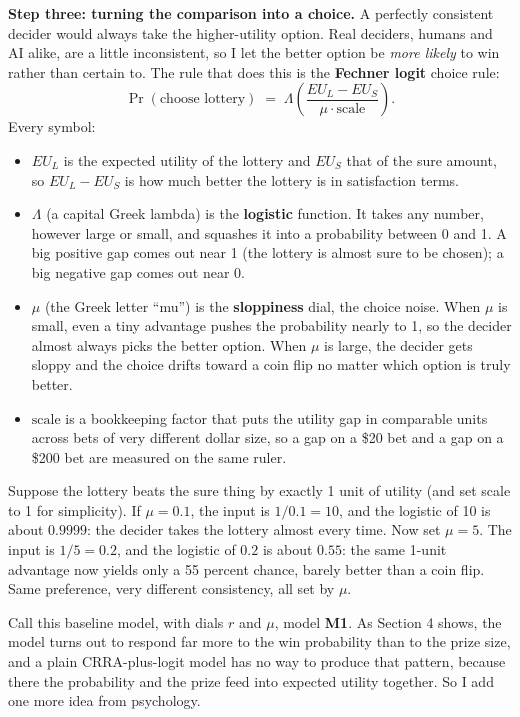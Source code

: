 \documentclass[11pt]{article}
\newcommand{\term}[1]{\textbf{\color{mossdk}#1}}
\begin{document}
\textbf{Step three: turning the comparison into a choice.} A perfectly consistent decider would always
take the higher-utility option. Real deciders, humans and AI alike, are a little inconsistent, so I let
the better option be \emph{more likely} to win rather than certain to. The rule that does this is the
\term{Fechner logit} choice rule:
\[
\Pr(\text{choose lottery}) \;=\; \Lambda\!\left(\frac{EU_L - EU_S}{\mu \cdot \text{scale}}\right).
\]
Every symbol:
\begin{itemize}
\item $EU_L$ is the expected utility of the lottery and $EU_S$ that of the sure amount, so $EU_L - EU_S$
is how much better the lottery is in satisfaction terms.
\item $\Lambda$ (a capital Greek lambda) is the \term{logistic} function. It takes any number, however
large or small, and squashes it into a probability between 0 and 1. A big positive gap comes out near 1
(the lottery is almost sure to be chosen); a big negative gap comes out near 0.
\item $\mu$ (the Greek letter ``mu'') is the \term{sloppiness} dial, the choice noise. When $\mu$ is
small, even a tiny advantage pushes the probability nearly to 1, so the decider almost always picks the
better option. When $\mu$ is large, the decider gets sloppy and the choice drifts toward a coin flip no
matter which option is truly better.
\item $\text{scale}$ is a bookkeeping factor that puts the utility gap in comparable units across bets of
very different dollar size, so a gap on a \$20 bet and a gap on a \$200 bet are measured on the same
ruler.
\end{itemize}

\begin{workbox}
Suppose the lottery beats the sure thing by exactly 1 unit of utility (and set scale to 1 for
simplicity). If $\mu = 0.1$, the input is $1/0.1 = 10$, and the logistic of 10 is about $0.9999$: the
decider takes the lottery almost every time. Now set $\mu = 5$. The input is $1/5 = 0.2$, and the
logistic of $0.2$ is about $0.55$: the same 1-unit advantage now yields only a 55 percent chance, barely
better than a coin flip. Same preference, very different consistency, all set by $\mu$.
\end{workbox}

Call this baseline model, with dials $r$ and $\mu$, model \textbf{M1}. As Section 4 shows, the model
turns out to respond far more to the win probability than to the prize size, and a plain CRRA-plus-logit
model has no way to produce that pattern, because there the probability and the prize feed into expected
utility together. So I add one more idea from psychology.
\end{document}
